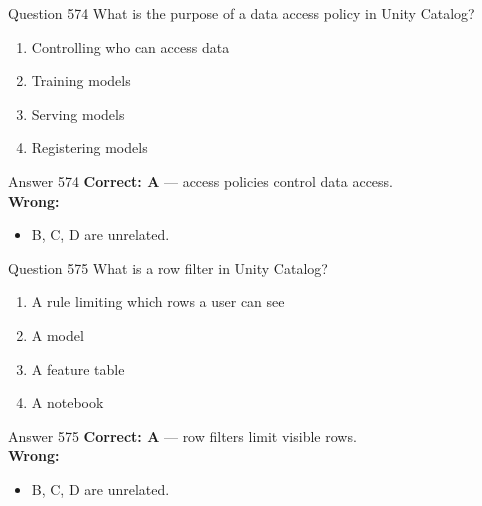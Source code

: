 \documentclass[aspectratio=169,11pt]{beamer}
\begin{document}
	\begin{frame}{Question 574}
		What is the purpose of a data access policy in Unity Catalog?
		\begin{enumerate}[label=\Alph*.]
			\item Controlling who can access data
			\item Training models
			\item Serving models
			\item Registering models
		\end{enumerate}
	\end{frame}
	\begin{frame}{Answer 574}
		\textbf{Correct: A} --- access policies control data access.\\
		\vspace{0.5em}
		\textbf{Wrong:}
		\begin{itemize}
			\item B, C, D are unrelated.
		\end{itemize}
	\end{frame}
	
	\begin{frame}{Question 575}
		What is a row filter in Unity Catalog?
		\begin{enumerate}[label=\Alph*.]
			\item A rule limiting which rows a user can see
			\item A model
			\item A feature table
			\item A notebook
		\end{enumerate}
	\end{frame}
	\begin{frame}{Answer 575}
		\textbf{Correct: A} --- row filters limit visible rows.\\
		\vspace{0.5em}
		\textbf{Wrong:}
		\begin{itemize}
			\item B, C, D are unrelated.
		\end{itemize}
	\end{frame}
	
\end{document}
